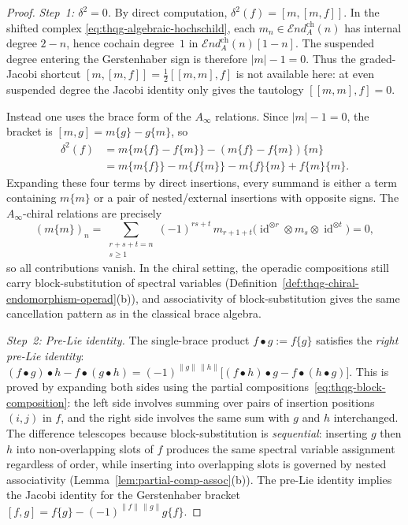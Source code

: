 \begin{proof}
\emph{Step~1: $\delta^2 = 0$.}
By direct computation, $\delta^2(f) = [m, [m, f]]$.
In the shifted complex
\eqref{eq:thqg-algebraic-hochschild}, each
$m_n \in \mathcal{E}\!nd^{\mathrm{ch}}_A(n)$ has internal
degree $2-n$, hence cochain degree~$1$ in
$\mathcal{E}\!nd^{\mathrm{ch}}_A(n)[1-n]$. The suspended
degree entering the Gerstenhaber sign is therefore
$|m|-1 = 0$. Thus the graded-Jacobi shortcut
$[m, [m, f]] = \tfrac{1}{2}[[m, m], f]$ is not available
here: at even suspended degree the Jacobi identity only gives
the tautology $[[m, m], f] = 0$.

Instead one uses the brace form of the $A_\infty$ relations.
Since $|m|-1 = 0$, the bracket is
$[m, g] = m\{g\} - g\{m\}$, so
\begin{align*}
\delta^2(f)
&= m\{m\{f\} - f\{m\}\} - (m\{f\} - f\{m\})\{m\} \\
&= m\{m\{f\}\} - m\{f\{m\}\}
 - m\{f\}\{m\} + f\{m\}\{m\}.
\end{align*}
Expanding these four terms by direct insertions, every summand is
either a term containing $m\{m\}$ or a pair of nested/external
insertions with opposite signs. The $A_\infty$-chiral relations
are precisely
\[
(m\{m\})_n
=
\sum_{\substack{r+s+t=n \\ s \ge 1}}
(-1)^{rs+t}\,
m_{r+1+t}\bigl(
\operatorname{id}^{\otimes r} \otimes m_s
\otimes \operatorname{id}^{\otimes t}\bigr)
= 0,
\]
so all contributions vanish. In the chiral setting, the
operadic compositions still carry block-substitution of spectral
variables
(Definition~\ref{def:thqg-chiral-endomorphism-operad}(b)), and
associativity of block-substitution gives the same cancellation
pattern as in the classical brace algebra.

\emph{Step~2: Pre-Lie identity.}
The single-brace product $f \bullet g := f\{g\}$ satisfies the
\emph{right pre-Lie identity}:
$(f \bullet g) \bullet h - f \bullet (g \bullet h)
= (-1)^{\|g\|\,\|h\|}\bigl[(f \bullet h) \bullet g
- f \bullet (h \bullet g)\bigr]$.
This is proved by expanding both sides using the partial
compositions~\eqref{eq:thqg-block-composition}: the left side
involves summing over pairs of insertion positions $(i, j)$ in
$f$, and the right side involves the same sum with $g$ and $h$
interchanged. The difference telescopes because
block-substitution is \emph{sequential}: inserting $g$ then $h$
into non-overlapping slots of $f$ produces the same spectral
variable assignment regardless of order, while inserting into
overlapping slots is governed by nested associativity
(Lemma~\ref{lem:partial-comp-assoc}(b)).
The pre-Lie identity implies the Jacobi identity for the
Gerstenhaber bracket $[f, g] = f\{g\} - (-1)^{\|f\|\,\|g\|} g\{f\}$.


\end{proof}
